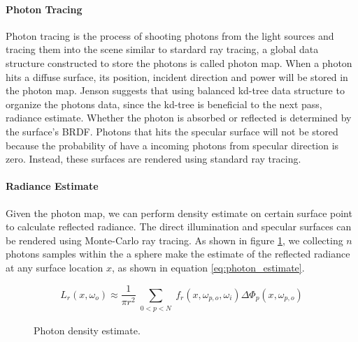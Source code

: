 \paragraph{Photon Tracing} 
Photon tracing is the process of shooting photons from the light sources and tracing them into the scene similar to stardard ray tracing, a global data structure constructed to store the photons is called photon map. When a photon hits a diffuse surface, its position, incident direction and power will be stored in the photon map. Jenson suggests that using balanced kd-tree data structure to organize the photons data, since the kd-tree is beneficial to the next pass, radiance estimate. Whether the photon is absorbed or reflected is determined by the surface's BRDF. Photons that hits the specular surface will not be stored because the probability of have a incoming photons from specular direction is zero. Instead, these surfaces are rendered using standard ray tracing. 

\paragraph{Radiance Estimate}
Given the photon map, we can perform density estimate on certain surface point to calculate reflected radiance. The direct illumination and specular surfaces can be rendered using Monte-Carlo ray tracing. As shown in figure \ref{fig:photon_density_estimate}, we collecting \(n\) photons samples within the a sphere make the estimate of the reflected radiance at any surface location \(x\), as shown in equation \ref{eq:photon_estimate}. 

\begin{equation}
L_r(x, \omega_{o}) \approx \frac{1}{\pi r^{2}}\sum_{\substack{0<p<N}}f_{r}(x, \omega_{p, o}, \omega_{i})\Delta \Phi_{p}(x,\omega_{p, o}) 
\label{eq:photon_estimate}
\end{equation} 

\begin{figure}[ftp] 
    \centering 
    \renewcommand{\thefigure}{\thechapter.\arabic{figure}}
    \caption[]{Photon density estimate.}
    \label{fig:photon_density_estimate} 
\end{figure} 


